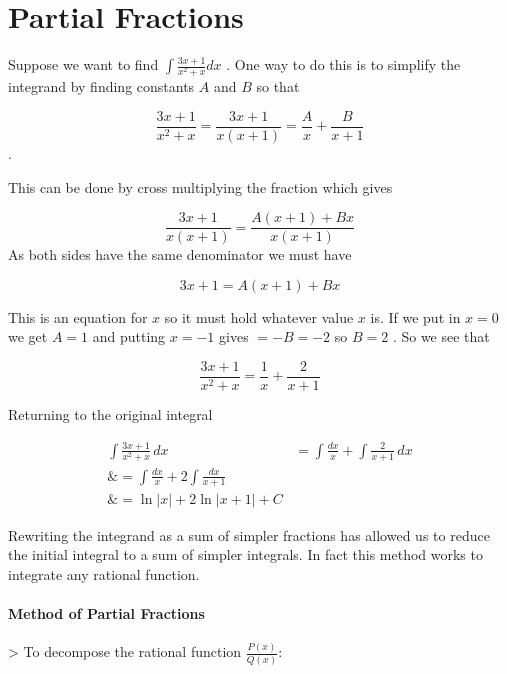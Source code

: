 \section{Partial Fractions}
\label{sec:partial-fractions}

Suppose we want to find $\int\frac{3x+1}{x^2+x}dx$ . One way to do this is to simplify the integrand by finding constants $A$ and $B$ so that



$$\frac{3x+1}{x^2+x}=\frac{3x+1}{x(x+1)}=\frac{A}{x}+\frac{B}{x+1}$$ .

This can be done by cross multiplying the fraction which gives



$$\frac{3x+1}{x(x+1)}=\frac{A(x+1)+Bx}{x(x+1)}$$ As both sides have the same denominator we must have



$$3x+1=A(x+1)+Bx$$

This is an equation for $x$ so it must hold whatever value $x$ is. If we put in $x=0$ we get $A=1$ and putting $x=-1$ gives $=-B=-2$ so $B=2$ . So we see that



$$\frac{3x+1}{x^2+x}=\frac{1}{x}+\frac{2}{x+1}$$



Returning to the original integral



\begin{align}
\int\frac{3x+1}{x^2+x}\,dx &= \int\frac{dx}{x} + \int\frac{2}{x+1}\,dx \\\&= \int\frac{dx}{x} + 2\int\frac{dx}{x+1} \\\&= \ln|x| + 2\ln\Big|x+1\Big| + C
\end{align}





Rewriting the integrand as a sum of simpler fractions has allowed us to reduce the initial integral to a sum of simpler integrals. In fact this method works to integrate any rational function.



\paragraph{Method of Partial Fractions}



> To decompose the rational function $\frac{P(x)}{Q(x)}$:

